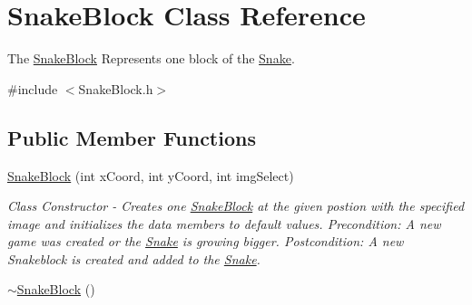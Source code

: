 \hypertarget{classSnakeBlock}{\section{\-Snake\-Block \-Class \-Reference}
\label{classSnakeBlock}
}


\-The \hyperlink{classSnakeBlock}{\-Snake\-Block} \-Represents one block of the \hyperlink{classSnake}{\-Snake}.  




{\ttfamily \#include $<$\-Snake\-Block.\-h$>$}

\subsection*{\-Public \-Member \-Functions}
\begin{DoxyCompactItemize}
\item 
\hyperlink{classSnakeBlock_a7d24658fa97c3ba0ee5eed5fe1edc96e}{\-Snake\-Block} (int x\-Coord, int y\-Coord, int img\-Select)
\begin{DoxyCompactList}\small\item\em \-Class \-Constructor -\/ \-Creates one \hyperlink{classSnakeBlock}{\-Snake\-Block} at the given postion with the specified image and initializes the data members to default values. \-Precondition\-: \-A new game was created or the \hyperlink{classSnake}{\-Snake} is growing bigger. \-Postcondition\-: \-A new \-Snakeblock is created and added to the \hyperlink{classSnake}{\-Snake}. \end{DoxyCompactList}\item 
\hypertarget{classSnakeBlock_a1fe79b21dd90c4477fdd55f152d2c989}{\hyperlink{classSnakeBlock_a1fe79b21dd90c4477fdd55f152d2c989}{$\sim$\-Snake\-Block} ()}\label{classSnakeBlock_a1fe79b21dd90c4477fdd55f152d2c989}


\end{DoxyCompactItemize}
